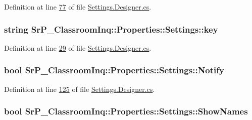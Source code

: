 \-Definition at line \hyperlink{_settings_8_designer_8cs_source_l00077}{77} of file \hyperlink{_settings_8_designer_8cs_source}{\-Settings.\-Designer.\-cs}.

\hypertarget{class_sr_p___classroom_inq_1_1_properties_1_1_settings_adcf8c99db5c2978cebd00b77880dc4f9}{
\subsubsection[{key}]{\setlength{\rightskip}{0pt plus 5cm}string \-Sr\-P\-\_\-\-Classroom\-Inq\-::\-Properties\-::\-Settings\-::key}}
\label{class_sr_p___classroom_inq_1_1_properties_1_1_settings_adcf8c99db5c2978cebd00b77880dc4f9}


\-Definition at line \hyperlink{_settings_8_designer_8cs_source_l00029}{29} of file \hyperlink{_settings_8_designer_8cs_source}{\-Settings.\-Designer.\-cs}.

\hypertarget{class_sr_p___classroom_inq_1_1_properties_1_1_settings_ad0c83bd5c1a79ad9f1690f5096d48306}{
\subsubsection[{\-Notify}]{\setlength{\rightskip}{0pt plus 5cm}bool \-Sr\-P\-\_\-\-Classroom\-Inq\-::\-Properties\-::\-Settings\-::\-Notify}}
\label{class_sr_p___classroom_inq_1_1_properties_1_1_settings_ad0c83bd5c1a79ad9f1690f5096d48306}


\-Definition at line \hyperlink{_settings_8_designer_8cs_source_l00125}{125} of file \hyperlink{_settings_8_designer_8cs_source}{\-Settings.\-Designer.\-cs}.

\hypertarget{class_sr_p___classroom_inq_1_1_properties_1_1_settings_abb110d7ebcceac8e89e8e7fced9da2b4}{
\subsubsection[{\-Show\-Names}]{\setlength{\rightskip}{0pt plus 5cm}bool \-Sr\-P\-\_\-\-Classroom\-Inq\-::\-Properties\-::\-Settings\-::\-Show\-Names}}
\label{class_sr_p___classroom_inq_1_1_properties_1_1_settings_abb110d7ebcceac8e89e8e7fced9da2b4}


